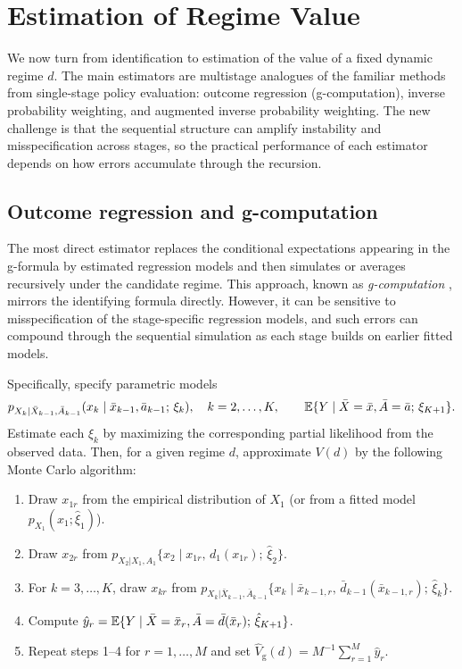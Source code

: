 \documentclass[master.tex]{subfiles}
\begin{document}
\section{Estimation of Regime Value}
\label{w15:sec:value-estimation}

We now turn from identification to estimation of the value of a fixed dynamic regime $d$. The main estimators are multistage analogues of the familiar methods from single-stage policy evaluation: outcome regression (g-computation), inverse probability weighting, and augmented inverse probability weighting. The new challenge is that the sequential structure can amplify instability and misspecification across stages, so the practical performance of each estimator depends on how errors accumulate through the recursion.

\subsection{Outcome regression and g-computation}
\label{w15:subsec:gcomp}

The most direct estimator replaces the conditional expectations appearing in the g-formula by estimated regression models and then simulates or averages recursively under the candidate regime. This approach, known as \emph{g-computation} \citep{robins1986new}, mirrors the identifying formula directly. However, it can be sensitive to misspecification of the stage-specific regression models, and such errors can compound through the sequential simulation as each stage builds on earlier fitted models.

Specifically, specify parametric models
\[
p_{X_k|\bar{X}_{k-1},\bar{A}_{k-1}}(x_k \mid \bar{x}_{k-1}, \bar{a}_{k-1};\, \xi_k), \quad k = 2,\ldots,K,
\qquad
\mathbb{E}\{Y \mid \bar{X}=\bar{x}, \bar{A}=\bar{a};\, \xi_{K+1}\}.
\]
Estimate each $\xi_k$ by maximizing the corresponding partial likelihood from the observed data. Then, for a given regime $d$, approximate $V(d)$ by the following Monte Carlo algorithm:

\begin{enumerate}
  \item Draw $x_{1r}$ from the empirical distribution of $X_1$ (or from a fitted model $p_{X_1}(x_1;\hat\xi_1)$).
  \item Draw $x_{2r}$ from $p_{X_2|X_1,A_1}\{x_2 \mid x_{1r},\, d_1(x_{1r});\, \hat\xi_2\}$.
  \item For $k = 3,\ldots,K$, draw $x_{kr}$ from $p_{X_k|\bar{X}_{k-1},\bar{A}_{k-1}}\{x_k \mid \bar{x}_{k-1,r},\, \bar{d}_{k-1}(\bar{x}_{k-1,r});\, \hat\xi_k\}$.
  \item Compute $\hat{y}_r = \mathbb{E}\{Y \mid \bar{X}=\bar{x}_r, \bar{A}=\bar{d}(\bar{x}_r);\,\hat\xi_{K+1}\}$.
  \item Repeat steps 1--4 for $r = 1,\ldots,M$ and set $\widehat{V}_{\mathrm{g}}(d) = M^{-1}\sum_{r=1}^M \hat{y}_r$.
\end{enumerate}
\end{document}
